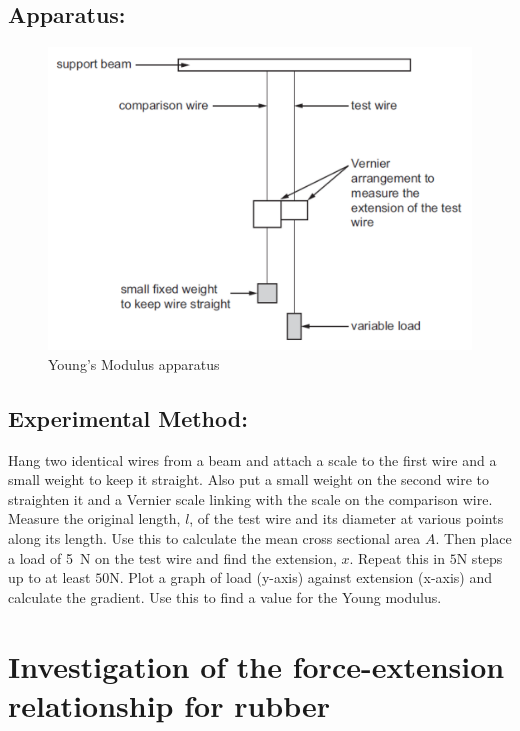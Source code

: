 \documentclass{tufte-handout}
\begin{document}
\subsection{Apparatus:}   
  \begin{figure}
\includegraphics[width=\textwidth]{youngmod.PNG}
\caption{Young's Modulus apparatus}
\end{figure}
  
\subsection{Experimental Method:}  
Hang two identical wires from a beam and attach a scale to the first wire and a small weight to keep it straight. Also put a small weight on the second wire to straighten it and a Vernier scale linking with the scale on the comparison wire. Measure the original length, $l$, of the test wire and its diameter at various points along its length. Use this to calculate the mean cross sectional area $A$.  
Then place a load of \SI{5}{N} on the test wire and find the extension, $x$. Repeat this in $5$N steps up to at least $50$N. Plot a graph of load (y-axis) against extension (x-axis) and calculate the gradient. Use this to find a value for the Young modulus. 

\section{Investigation of the force-extension relationship for rubber}
\end{document}

